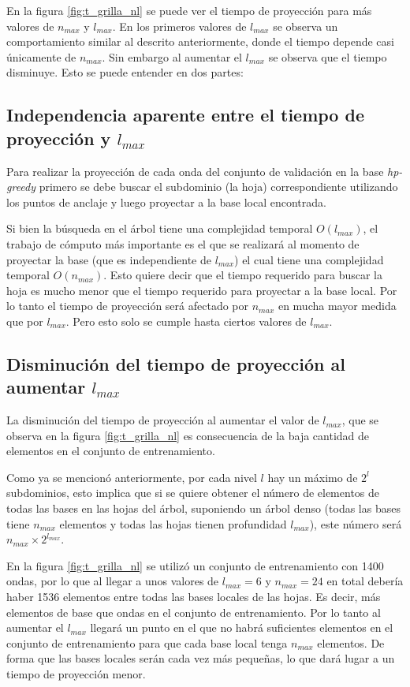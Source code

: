 En la figura \ref{fig:t_grilla_nl} se puede ver el tiempo de proyección para más valores de $n_{max}$ y $l_{max}$. En los primeros valores de $l_{max}$ se observa un comportamiento similar al descrito anteriormente, donde el tiempo depende casi únicamente de $n_{max}$. Sin embargo al aumentar el $l_{max}$ se observa que el tiempo disminuye. Esto se puede entender en dos partes:


\subsection*{Independencia aparente entre el tiempo de proyección y $l_{max}$}
Para realizar la proyección de cada onda del conjunto de validación en la base \textit{hp-greedy} primero se debe buscar el subdominio (la hoja) correspondiente utilizando los puntos de anclaje y luego proyectar a la base local encontrada. 

Si bien la búsqueda en el árbol tiene una complejidad temporal $O(l_{max})$, el trabajo de cómputo más importante es el que se realizará al momento de proyectar la base (que es independiente de $l_{max}$) el cual tiene una complejidad temporal $O(n_{max})$. Esto quiere decir que el tiempo requerido para buscar la hoja es mucho menor que el tiempo requerido para proyectar a la base local. Por lo tanto el tiempo de proyección será afectado por $n_{max}$ en mucha mayor medida que por $l_{max}$. Pero esto solo se cumple hasta ciertos valores de $l_{max}$.

\subsection*{Disminución del tiempo de proyección al aumentar $l_{max}$}

La disminución del tiempo de proyección al aumentar el valor de $l_{max}$, que se observa en la figura \ref{fig:t_grilla_nl} es consecuencia de la baja cantidad de elementos en el conjunto de entrenamiento.

Como ya se mencionó anteriormente, por cada nivel $l$ hay un máximo de $2^l$ subdominios, esto implica que si se quiere obtener el número de elementos de todas las bases en las hojas del árbol, suponiendo un árbol denso (todas las bases tiene $n_{max}$ elementos y todas las hojas tienen profundidad $l_{max}$), este número será $n_{max} \times 2^{l_{max}}$. 

En la figura \ref{fig:t_grilla_nl} se utilizó un conjunto de entrenamiento con 1400 ondas, por lo que al llegar a unos valores de $l_{max} = 6$ y $n_{max} = 24$ en total debería haber 1536 elementos entre todas las bases locales de las hojas. Es decir, más elementos de base que ondas en el conjunto de entrenamiento. Por lo tanto al aumentar el $l_{max}$ llegará un punto en el que no habrá suficientes elementos en el conjunto de entrenamiento para que cada base local tenga $n_{max}$ elementos. De forma que las bases locales serán cada vez más pequeñas, lo que dará lugar a un tiempo de proyección menor.

